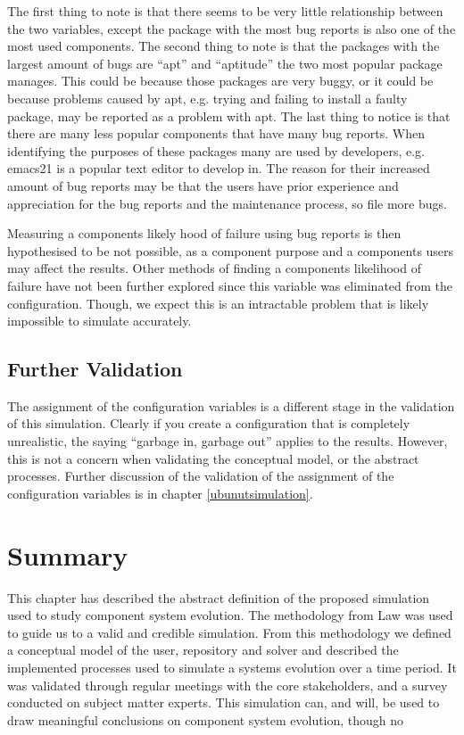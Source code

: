 The first thing to note is that there seems to be very little relationship between the two variables, except the package with the most bug reports is also one of the most used components.
The second thing to note is that the packages with the largest amount of bugs are ``apt'' and ``aptitude'' the two most popular package manages.
This could be because those packages are very buggy, or it could be because problems caused by apt, e.g. trying and failing to install a faulty package, may be reported as a problem with apt. 
The last thing to notice is that there are many less popular components that have many bug reports.
When identifying the purposes of these packages many are used by developers, e.g. emacs21 is a popular text editor to develop in.
The reason for their increased amount of bug reports may be that the users have prior experience and appreciation for the bug reports and the maintenance process, so file more bugs.

Measuring a components likely hood of failure using bug reports is then hypothesised to be not possible,
as a component purpose and a components users may affect the results.
Other methods of finding a components likelihood of failure have not been further explored since this variable was eliminated from the configuration.
Though, we expect this is an intractable problem that is likely impossible to simulate accurately.

\subsection{Further Validation}
The assignment of the configuration variables is a different stage in the validation of this simulation.
Clearly if you create a configuration that is completely unrealistic, the saying ``garbage in, garbage out'' applies to the results.
However, this is not a concern when validating the conceptual model, or the abstract processes.
Further discussion of the validation of the assignment of the configuration variables is in chapter \ref{ubunutsimulation}.

\section{Summary}
{}This chapter has described the abstract definition of the proposed simulation used to study component system evolution.
{}The methodology from Law \cite{Law2005} was used to guide us to a valid and credible simulation.
{}From this methodology we defined a conceptual model of the user, repository and solver and described the implemented processes used to simulate a systems evolution over a time period.
{}It was validated through regular meetings with the core stakeholders, and a survey conducted on subject matter experts.
{}This simulation can, and will, be used to draw meaningful conclusions on component system evolution, though no
